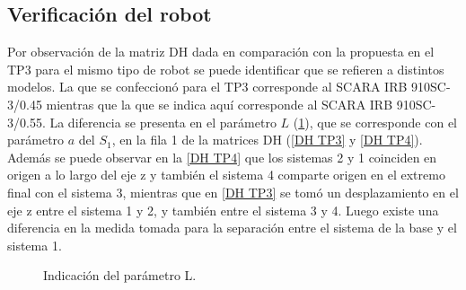 \documentclass[a4paper,12pt]{article}
\begin{document}
\subsection{Verificación del robot}
Por observación de la matriz DH dada en comparación con la propuesta
en el TP3 para el mismo tipo de robot se puede identificar que se refieren
a distintos modelos. La que se confeccionó para el TP3 corresponde al 
SCARA IRB 910SC-3/0.45 mientras que la que se indica aquí corresponde al
SCARA IRB 910SC-3/0.55. La diferencia se presenta en el parámetro $L$ (\cref{diferencia SCARA}), que se corresponde
con el parámetro $a$ del $S_1$, en la fila 1 de la matrices DH (\cref{DH TP3} y \cref{DH TP4}). Además
se puede observar en la \cref{DH TP4} que los sistemas 2 y 1 coinciden en origen a lo largo del eje z
y también el sistema 4 comparte origen en el extremo final con el sistema 3, mientras que en \cref{DH TP3}
se tomó un desplazamiento en el eje z entre el sistema 1 y 2, y también entre el sistema 3 y 4.
Luego existe una diferencia en la medida tomada para la separación entre el sistema de la base
y el sistema 1.

\begin{figure}[H]
    \centering
    \begin{adjustbox}{scale = 0.8,max width=\columnwidth}
    \end{adjustbox}
    \caption{Indicación del parámetro L.}
    \label{diferencia SCARA}
\end{figure}
\end{document}

